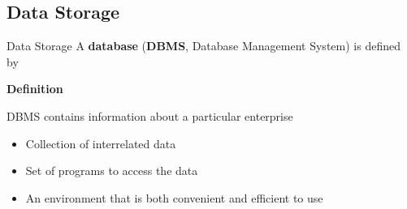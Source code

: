 \documentclass{beamer}
\begin{document}
    \subsection{Data Storage}
    \begin{frame}{Data Storage}
        A \textbf{database} (\textbf{DBMS}, Database Management System) is defined by 
        \begin{block} {\textbf{Definition}}

        DBMS contains information about a particular enterprise
        \begin{itemize}
            \item Collection of interrelated data
            \item Set of programs to access the data 
            \item An environment that is both convenient and efficient to use
        \end{itemize}
        \cite{Silberschatz2010}
        \end{block}
    \end{frame}
    
\end{document}
